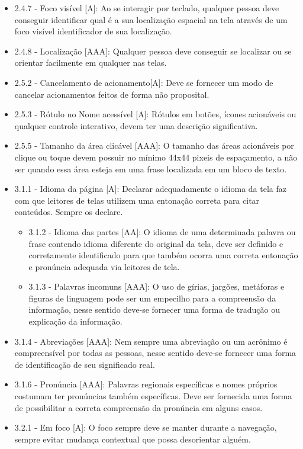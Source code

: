 {\begin{itemize}
\begin{itemize}
\end{itemize}
\item 2.4.7 - Foco visível [A]: Ao se interagir por teclado, qualquer pessoa deve conseguir identificar qual é a sua localização espacial na tela através de um foco visível identificador de sua localização.
\item 2.4.8 - Localização [AAA]: Qualquer pessoa deve conseguir se localizar ou se orientar facilmente em qualquer nas telas.
\item 2.5.2 - Cancelamento de acionamento[A]: Deve se fornecer um modo de cancelar acionamentos feitos de forma não proposital.
\item 2.5.3 - Rótulo no Nome acessível [A]: Rótulos em botões, ícones acionáveis ou qualquer controle interativo, devem ter uma descrição significativa.
\item 2.5.5 - Tamanho da área clicável [AAA]: O tamanho das áreas acionáveis por clique ou toque devem possuir no mínimo 44x44 pixeis de espaçamento, a não ser quando essa área esteja em uma frase localizada em um bloco de texto.
\item 3.1.1 - Idioma da página [A]: Declarar adequadamente o idioma da tela faz com que leitores de telas utilizem uma entonação correta para citar conteúdos. Sempre os declare.
\begin{itemize}
\item 3.1.2 - Idioma das partes [AA]: O idioma de uma determinada palavra ou frase contendo idioma diferente do original da tela, deve ser definido e corretamente identificado para que também ocorra uma correta entonação e pronúncia adequada via leitores de tela.
\item 3.1.3 - Palavras incomuns [AAA]: O uso de gírias, jargões, metáforas e figuras de linguagem pode ser um empecilho para a compreensão da informação, nesse sentido deve-se fornecer uma forma de tradução ou explicação da informação.
\end{itemize}
\item 3.1.4 - Abreviações [AAA]: Nem sempre uma abreviação ou um acrônimo é compreensível por todas as pessoas, nesse sentido deve-se fornecer uma forma de identificação de seu significado real.
\item 3.1.6 - Pronúncia [AAA]: Palavras regionais específicas e nomes próprios costumam ter pronúncias também específicas. Deve ser fornecida uma forma de possibilitar a correta compreensão da pronúncia em alguns casos.
\item 3.2.1 - Em foco [A]: O foco sempre deve se manter durante a navegação, sempre evitar mudança contextual que possa desorientar alguém.

\end{itemize}}
